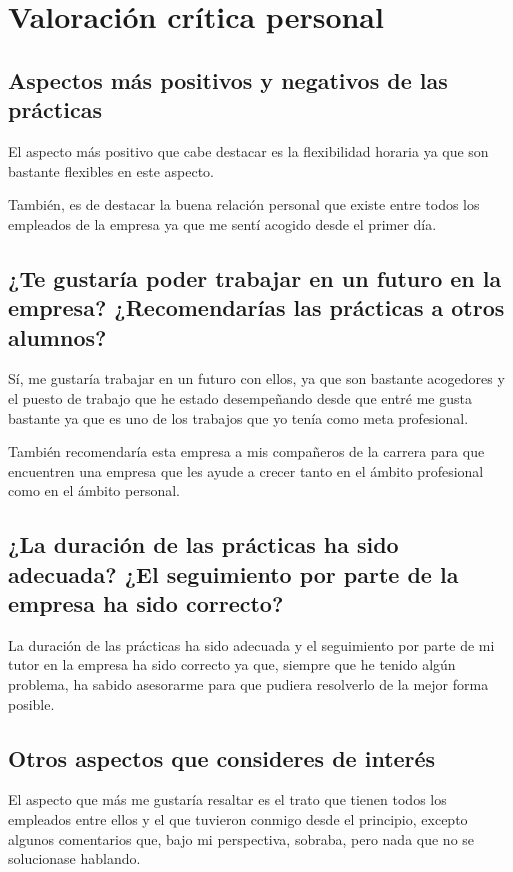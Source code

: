 \documentclass[12pt,letterpaper]{article}
\begin{document}
\section{Valoración crítica personal}
\subsection{Aspectos más positivos y negativos de las prácticas}
El aspecto más positivo que cabe destacar es la flexibilidad horaria ya que son bastante flexibles en este aspecto.

También, es de destacar la buena relación personal que existe entre todos los empleados de la empresa ya que me sentí acogido desde el primer día.

\subsection{¿Te gustaría poder trabajar en un futuro en la empresa? ¿Recomendarías las prácticas a otros alumnos?}
Sí, me gustaría trabajar en un futuro con ellos, ya que son bastante acogedores y el puesto de trabajo que he estado desempeñando desde que entré me gusta bastante ya que es uno de los trabajos que yo tenía como meta profesional.

También recomendaría esta empresa a mis compañeros de la carrera para que encuentren una empresa que les ayude a crecer tanto en el ámbito profesional como en el ámbito personal.

\subsection{¿La duración de las prácticas ha sido adecuada? ¿El seguimiento por parte de la empresa ha sido correcto?}
La duración de las prácticas ha sido adecuada y el seguimiento por parte de mi tutor en la empresa ha sido correcto ya que, siempre que he tenido algún problema, ha sabido asesorarme para que pudiera resolverlo de la mejor forma posible.

\subsection{Otros aspectos que consideres de interés}
El aspecto que más me gustaría resaltar es el trato que tienen todos los empleados entre ellos y el que tuvieron conmigo desde el principio, excepto algunos comentarios que, bajo mi perspectiva, sobraba, pero nada que no se solucionase hablando.
\end{document}
